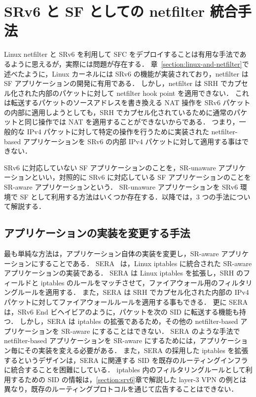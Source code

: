 \section{SRv6 と SF としての netfilter 統合手法}
\label{section:netfilter-as-nf}
Linux netfilter と SRv6 を利用して SFC をデプロイすることは有用な手法であるように思えるが，実際には問題が存在する．
章~\ref*{section:linux-and-netfilter}で述べたように，Linux カーネルには SRv6 の機能が実装されており，netfilter は SF アプリケーションの開発に有用である．
しかし，netfilter は SRH でカプセル化された内部のパケットに対して netfilter hook point を適用できない．
これは転送するパケットのソースアドレスを書き換える NAT 操作を SRv6 パケットの内部に適用しようとしても，SRH でカプセル化されているために通常のパケットと同じ操作では NAT を適用することができないからである．
つまり，一般的な IPv4 パケットに対して特定の操作を行うために実装された netfilter-based アプリケーションを SRv6 の内部 IPv4 パケットに対して適用する事はできない．

SRv6 に対応していない SF アプリケーションのことを，SR-unaware アプリケーションといい，対照的に SRv6 に対応している SF アプリケーションのことを SR-aware アプリケーションという．
SR-unaware アプリケーションを SRv6 環境で SF として利用する方法はいくつか存在する．以降では，3 つの手法について解説する．

\subsection*{アプリケーションの実装を変更する手法}
\label{sbsection:change-impl}
最も単純な方法は，アプリケーション自体の実装を変更し，SR-aware アプリケーションにすることである．
SERA~\cite{sera} は，Linux iptables に統合された SR-aware アプリケーションの実装である．
SERA は Linux iptables を拡張し，SRH のフィールドと iptables のルールをマッチさせて，ファイアウォール用のフィルタリングルールを適用する．
また，SERA は SRH でカプセル化された内部の IPv4 パケットに対してファイアウォールルールを適用する事もできる．
更に SERA は，SRv6 End ビヘイビアのように，パケットを次の SID に転送する機能も持つ．
しかし，SERA は iptables の拡張であるため，その他の netfilter-based アプリケーションを SR-aware にすることはできない．
SERA のような手法で netfilter-based アプリケーションを SR-aware にするためには，アプリケーション毎にその実装を変える必要がある．
また，SERA の採用した iptables を拡張するというデザインは，SERA に関連する SID を既存のルーティングインフラに統合することを困難にしている．
iptables 内のフィルタリングルールとして利用するための SID の情報は，\ref*{section:srv6}章で解説した layer-3 VPN の例とは異なり，既存のルーティングプロトコルを通じて広告することはできない．

